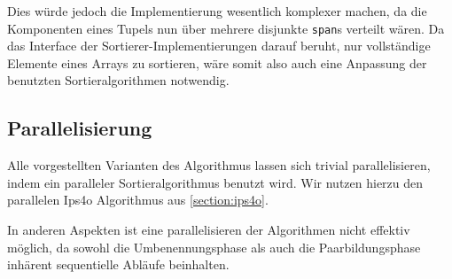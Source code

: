 
Dies würde jedoch die Implementierung wesentlich komplexer machen, da die Komponenten eines Tupels nun über mehrere disjunkte \texttt{span}s verteilt wären. Da das Interface der Sortierer-Implementierungen darauf beruht, nur vollständige Elemente eines Arrays zu sortieren, wäre somit also auch eine Anpassung der benutzten Sortieralgorithmen notwendig.

\subsection{Parallelisierung}
\label{chapter:saca:doubling:par}

Alle vorgestellten Varianten des Algorithmus lassen sich trivial parallelisieren, indem ein paralleler Sortieralgorithmus benutzt wird. Wir nutzen hierzu den parallelen Ips4o Algorithmus aus \cref{section:ips4o}.

In anderen Aspekten ist eine parallelisieren der Algorithmen nicht effektiv möglich, da sowohl die Umbenennungsphase als auch die Paarbildungsphase inhärent sequentielle Abläufe beinhalten.
